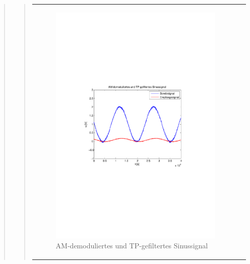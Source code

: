 \begin{quote}
\begin{quote}
\begin{center}
\begin{tabular}{ll}
\begin{minipage}{0.6\textwidth}
                    \begin{figure}[H]
                        \label{fig:}
                        \includegraphics[scale=0.5, trim = 2cm 6.5cm 1.5cm
                        8.5cm, clip]{./Bilder/synchDemodFilter_sinus} %
                        \caption{AM-demoduliertes und
                        TP-gefiltertes Sinussignal}
                    \end{figure}

                \end{minipage}
                \begin{minipage}{0.6\textwidth}


\end{minipage}
\end{tabular}
\end{center}
\end{quote}
\end{quote}
